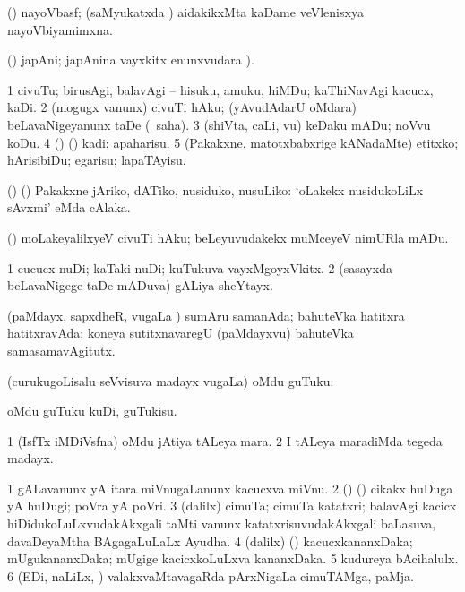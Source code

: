 \bentry
{}
\gl{\gu}
\bmng
(\ravi) nayoVbasf; (saMyukatxda \vi) aidakikxMta kaDame veVlenisxya nayoVbiyamimxna. 
\emng
\eentry

\bentry
{}
\gl{\nA}
\bmng
(\ashi) japAni; japAnina vayxkitx  enunxvudara \saMkiSx). 
\emng
\eentry

\bentry
{}
\gl{\sakirx}
\bmng
\bnum
\num{1} civuTu; birusAgi, balavAgi -- hisuku, amuku, hiMDu; kaThiNavAgi kacucx, kaDi. 
\num{2} (mogugx \mo vanunx) civuTi hAku; (yAvudAdarU oMdara) beLavaNigeyanunx taDe (\rUpa\ saha). 
\num{3} (shiVta, caLi, \mo vu) keDaku mADu; noVvu koDu. 
\num{4} (\ame) (\ashi) kadi; apaharisu. 
\num{5} (Pakakxne, matotxbabxrige kANadaMte) etitxko; hArisibiDu; egarisu; lapaTAyisu. 
\enum
\emng

\noindent
\gl{\akirx}
\bmng
(\birx) (\ame) Pakakxne jAriko, dATiko, nusiduko, nusuLiko:  `oLakekx nusidukoLiLx sAvxmi' eMda cAlaka. 
\emng

\noindent
\gl{\pagu}
\bmng
{}(\rUpa) moLakeyalilxyeV civuTi hAku; beLeyuvudakekx muMceyeV nimURla mADu. 
\emng
\eentry

\bentry
{}
\gl{\nA}
\bmng
\bnum
\num{1} cucucx nuDi; kaTaki nuDi; kuTukuva vayxMgoyxVkitx. 
\num{2} (sasayxda beLavaNigege taDe mADuva) gALiya sheYtayx. 
\enum
\emng

\noindent
\gl{\pagu}
\bmng
{} (paMdayx, sapxdheR, \mo vugaLa \vi) sumAru samanAda; bahuteVka hatitxra hatitxravAda:  koneya sutitxnavaregU (paMdayxvu) bahuteVka samasamavAgitutx. 
\emng
\eentry

\bentry
{}
\gl{\nA}
\bmng
(curukugoLisalu seVvisuva madayx \mo vugaLa) oMdu guTuku. 
\emng
\eentry

\bentry
{}
\gl{\akirx}
\bmng
oMdu guTuku kuDi, guTukisu. 
\emng
\eentry

\bentry
{}
\gl{\nA}
\bmng
\bnum
\num{1} (IsfTx iMDiVsfna) oMdu jAtiya tALeya mara. 
\num{2} I tALeya maradiMda tegeda madayx. 
\enum
\emng
\eentry

\bentry
{}
\gl{\nA}
\bmng
\bnum
\num{1} gALavanunx yA itara miVnugaLanunx kacucxva miVnu. 
\num{2} (\birx) (\asaM) cikakx huDuga yA huDugi; poVra yA poVri. 
\num{3} (\bava dalilx) cimuTa; cimuTa katatxri; balavAgi kacicx hiDidukoLuLxvudakAkxgali taMti \mo vanunx katatxrisuvudakAkxgali baLasuva, davaDeyaMtha BAgagaLuLaLx Ayudha. 
\num{4} (\bava dalilx) (\pArxparx) kacucxkananxDaka; mUgukananxDaka; mUgige kacicxkoLuLxva kananxDaka. 
\num{5} kudureya bAcihalulx. 
\num{6} (EDi, naLiLx, \mo) valakxvaMtavagaRda pArxNigaLa cimuTAMga, paMja. 
\enum
\emng
\eentry

